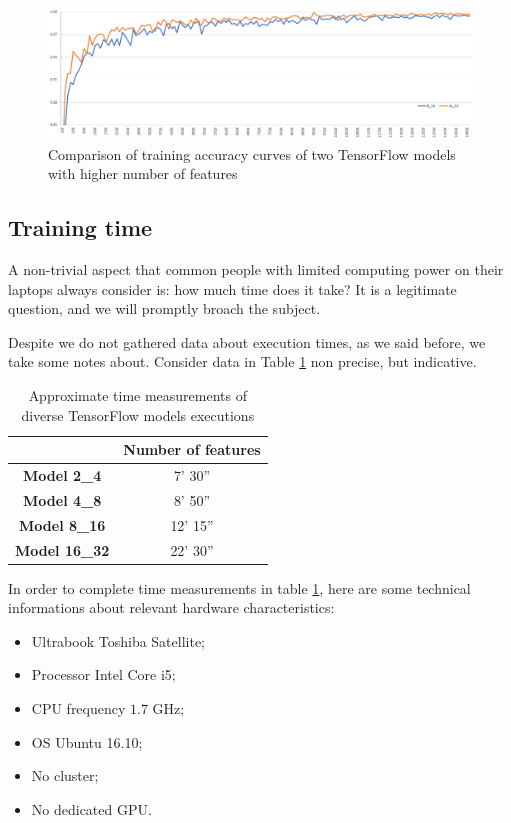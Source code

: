 \begin{landscape}
\begin{figure}
	\centering
	\includegraphics[width=1\textheight]{Images/cfr_8_16_vs_16_32}
	\caption{Comparison of training accuracy curves of two TensorFlow models with higher number of features}
	\label{fig:cfr_high}
\end{figure}
\end{landscape}

\subsection{Training time}

A non-trivial aspect that common people with limited computing power on their laptops always consider is: how much time does it take? It is a legitimate question, and we will promptly broach the subject.

Despite we do not gathered data about execution times, as we said before, we take some notes about. Consider data in Table \ref{tab:approx_times} non precise, but indicative.

\begin{table}
	\centering
	\begin{tabular}{cc}
		\hline 
		& \textbf{Number of features} \\ 
		\hline 
		\textbf{Model 2\_4} & 7' 30'' \\ 
		\textbf{Model 4\_8} & 8' 50'' \\ 
		\textbf{Model 8\_16} & 12' 15'' \\ 
		\textbf{Model 16\_32} & 22' 30'' \\ 
		\hline 
	\end{tabular}
	\caption{Approximate time measurements of diverse TensorFlow models executions}
	\label{tab:approx_times}
\end{table}

In order to complete time measurements in table \ref{tab:approx_times}, here are some technical informations about relevant hardware characteristics:
\begin{itemize}
	\item Ultrabook Toshiba Satellite;
	\item Processor Intel Core i5;
	\item CPU frequency $1.7$ GHz;
	\item OS Ubuntu 16.10;
	\item No cluster;
	\item No dedicated GPU.
\end{itemize}

